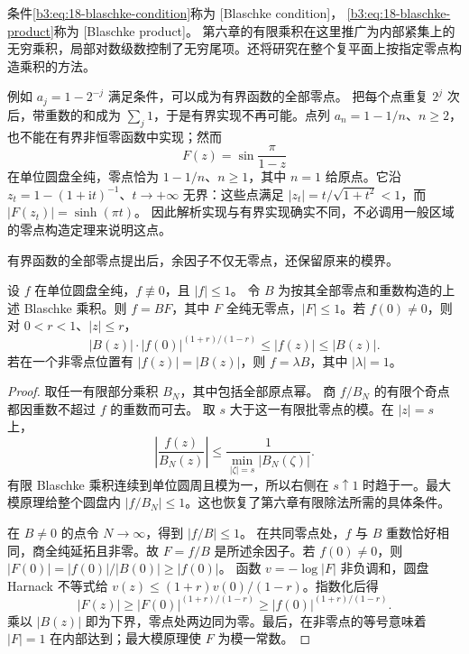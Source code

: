 条件\eqref{b3:eq:18-blaschke-condition}称为
[Blaschke condition]，
\eqref{b3:eq:18-blaschke-product}称为
[Blaschke product]。
第六章的有限乘积在这里推广为内部紧集上的无穷乘积，局部对数级数控制了无穷尾项。还将研究在整个复平面上按指定零点构造乘积的方法。

\ProseParagraphBreak
例如 \(a_j=1-2^{-j}\) 满足条件，可以成为有界函数的全部零点。
把每个点重复 \(2^j\) 次后，带重数的和成为 \(\sum_j1\)，于是有界实现不再可能。点列 \(a_n=1-1/n\)、\(n\ge2\)，也不能在有界非恒零函数中实现；然而
\[
 F(z)=\sin\frac{\pi}{1-z}
\]
在单位圆盘全纯，零点恰为 \(1-1/n\)、\(n\ge1\)，其中 \(n=1\) 给原点。它沿
\(z_t=1-(1+\mathrm it)^{-1}\)、\(t\to+\infty\) 无界：这些点满足
\(|z_t|=t/\sqrt{1+t^2}<1\)，而 \(|F(z_t)|=\sinh(\pi t)\)。
因此解析实现与有界实现确实不同，不必调用一般区域的零点构造定理来说明这点。

\ProseParagraphBreak
有界函数的全部零点提出后，余因子不仅无零点，还保留原来的模界。

\begin{proposition}[有界函数的零点分解]\label{b3:prop:18-bounded-factorization}
设 \(f\) 在单位圆盘全纯，\(f\not\equiv0\)，且 \(|f|\le1\)。
令 \(B\) 为按其全部零点和重数构造的上述 Blaschke 乘积。则
\(f=BF\)，其中 \(F\) 全纯无零点，\(|F|\le1\)。若 \(f(0)\ne0\)，则对
\(0<r<1\)、\(|z|\le r\)，
\[
 |B(z)|\cdot|f(0)|^{(1+r)/(1-r)}
 \le |f(z)|\le|B(z)|.
\]
若在一个非零点位置有 \(|f(z)|=|B(z)|\)，则 \(f=\lambda B\)，其中 \(|\lambda|=1\)。
\end{proposition}
\begin{proof}
取任一有限部分乘积 \(B_N\)，其中包括全部原点幂。
商 \(f/B_N\) 的有限个奇点都因重数不超过 \(f\) 的重数而可去。
取 \(s\) 大于这一有限批零点的模。在 \(|z|=s\) 上，
\[
 \left|\frac{f(z)}{B_N(z)}\right|
 \le\frac1{\min_{|\zeta|=s}|B_N(\zeta)|}.
\]
有限 Blaschke 乘积连续到单位圆周且模为一，所以右侧在
\(s\uparrow1\) 时趋于一。最大模原理给整个圆盘内
\(|f/B_N|\le1\)。这也恢复了第六章有限除法所需的具体条件。

在 \(B\ne0\) 的点令 \(N\to\infty\)，得到 \(|f/B|\le1\)。
在共同零点处，\(f\) 与 \(B\) 重数恰好相同，商全纯延拓且非零。故 \(F=f/B\) 是所述余因子。若 \(f(0)\ne0\)，则
\(|F(0)|=|f(0)|/|B(0)|\ge|f(0)|\)。
函数 \(v=-\log|F|\) 非负调和，圆盘 Harnack 不等式给
\(v(z)\le(1+r)v(0)/(1-r)\)。指数化后得
\[
 |F(z)|\ge |F(0)|^{(1+r)/(1-r)}
          \ge|f(0)|^{(1+r)/(1-r)}.
\]
乘以 \(|B(z)|\) 即为下界，零点处两边同为零。最后，在非零点的等号意味着 \(|F|=1\) 在内部达到；最大模原理使 \(F\) 为模一常数。
\end{proof}

